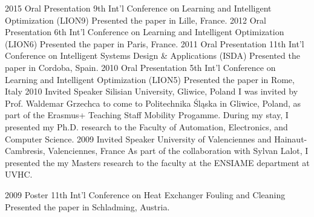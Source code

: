 \begin{entrylist}
\entry
{2015}
{Oral Presentation}
{9th Int'l Conference on Learning and Intelligent Optimization (LION9)}
{Presented the paper  in Lille, France.}
\entry
{2012}
{Oral Presentation}
{6th Int'l Conference on Learning and Intelligent Optimization (LION6)}
{Presented the paper  in Paris,  France.}
\entry
{2011}
{Oral Presentation}
{11th Int'l Conference on Intelligent Systems Design \& Applications (ISDA)}
{Presented the paper   in Cordoba, Spain.}
\entry
{2010}
{Oral Presentation}
{5th Int'l Conference on Learning and Intelligent Optimization (LION5)}
{Presented the paper  in Rome, Italy}
\entry
{2010}
{Invited Speaker}
{Silisian University, Gliwice, Poland}
{I was invited by Prof. Waldemar Grzechca to come to Politechnika Śląska in Gliwice, Poland, as part of the Erasmus+ Teaching Staff Mobility Progamme. During my stay, I presented my Ph.D. research to the Faculty of Automation, Electronics, and Computer Science.}
\entry
{2009}
{Invited Speaker}
{University of Valenciennes and Hainaut-Cambresis, Valenciennes, France}
{As part of the collaboration with Sylvan Lalot, I presented the my Masters research to the faculty at the ENSIAME department at UVHC.}
\end{entrylist}
\begin{entrylist}
\entry
{2009}
{Poster}
{11th Int'l Conference on Heat Exchanger Fouling and Cleaning}
{Presented the paper  in Schladming, Austria.}
\end{entrylist}
